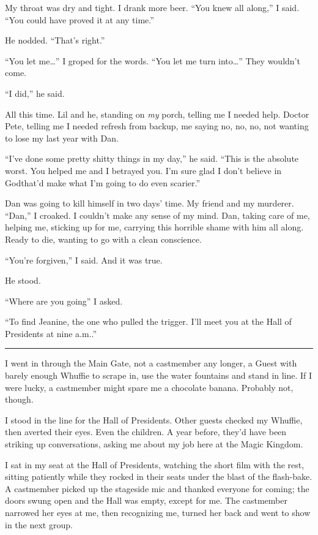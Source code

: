 My throat was dry and tight. I drank more beer. “You knew all
along,” I said. “You could have proved it at any time.”

He nodded. “That's right.”

“You let me…” I groped for the words. “You let me turn into…” They
wouldn't come.

“I did,” he said.

All this time. Lil and he, standing on \emph{my} porch, telling me
I needed help. Doctor Pete, telling me I needed refresh from
backup, me saying no, no, no, not wanting to lose my last year with
Dan.

“I've done some pretty shitty things in my day,” he said. “This is
the absolute worst. You helped me and I betrayed you. I'm sure glad
I don't believe in God{\dash}that'd make what I'm going to do even
scarier.”

Dan was going to kill himself in two days' time. My friend and my
murderer. “Dan,” I croaked. I couldn't make any sense of my mind.
Dan, taking care of me, helping me, sticking up for me, carrying
this horrible shame with him all along. Ready to die, wanting to go
with a clean conscience.

“You're forgiven,” I said. And it was true.

He stood.

“Where are you going” I asked.

“To find Jeanine, the one who pulled the trigger. I'll meet you at
the Hall of Presidents at nine a.m..”

\begin{center}\rule{3in}{0.4pt}\end{center}

I went in through the Main Gate, not a castmember any longer, a
Guest with barely enough Whuffie to scrape in, use the water
fountains and stand in line. If I were lucky, a castmember might
spare me a chocolate banana. Probably not, though.

I stood in the line for the Hall of Presidents. Other guests
checked my Whuffie, then averted their eyes. Even the children. A
year before, they'd have been striking up conversations, asking me
about my job here at the Magic Kingdom.

I sat in my seat at the Hall of Presidents, watching the short film
with the rest, sitting patiently while they rocked in their seats
under the blast of the flash-bake. A castmember picked up the
stageside mic and thanked everyone for coming; the doors swung open
and the Hall was empty, except for me. The castmember narrowed her
eyes at me, then recognizing me, turned her back and went to show
in the next group.

